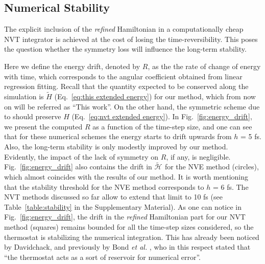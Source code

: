 \documentclass[
journal=jctcce,
layout=twocolumn
]{achemso}
\newcommand{\Ham}[1]{{\mathcal H}_\text{#1}}    %
\newcommand{\modified}[1]{\widetilde{#1}}
\begin{document}
 \subsection*{Numerical Stability}

The explicit inclusion of the \textit{refined} Hamiltonian in a computationally cheap NVT integrator is achieved at the cost of losing the time-reversibility.
This poses the question whether the symmetry loss will influence the long-term stability.

Here we define the energy drift, denoted by $R$, as the the rate of change of energy with time, which corresponds to the angular coefficient obtained from linear regression fitting.
Recall that the quantity expected to be conserved along the simulation is $\widetilde{H}$ (Eq.~\ref{eq:this extended energy}) for our method, which from now on will be referred as ``This work''.
On the other hand, the symmetric scheme due to \citeauthor{Martyna_1996} \cite{Martyna_1996} should preserve $H$ (Eq.~\ref{eq:nvt extended energy}).
In Fig.~\ref{fig:energy_drift}, we present the computed $R$ as a function of the time-step size, and one can see that for these numerical schemes the energy starts to drift upwards from $h$ = 5 fs. 
Also, the long-term stability is only modestly improved by our method. Evidently, the impact of the lack of symmetry on $R$, if any, is negligible.
Fig.~\ref{fig:energy_drift} also contains the drift in $\modified{\Ham{}}$ for the NVE method \cite{Silveira_2017} (circles), which almost coincides with the results of our method. It is worth mentioning that the stability threshold for the NVE method corresponds to $h$ = 6 fs.
The NVT methods discussed so far allow to extend that limit to 10 fs (see Table~\ref{table:stability} in the Supplementary Material). As one can notice in Fig.~\ref{fig:energy_drift}, the drift in the \textit{refined} Hamiltonian part for our NVT method (squares) remains bounded for all the time-step sizes considered, so the thermostat is stabilizing the numerical integration.
This has already been noticed by Davidchack\cite{Davidchack_2009}, and previously by Bond \textit{et al.} \cite{Bond_2007}, who in this respect stated that ``the thermostat acts as a sort of reservoir for numerical error''.
\end{document}

